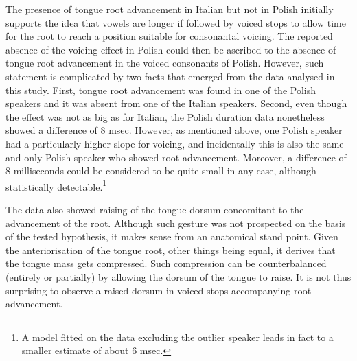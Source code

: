\documentclass[authoryear]{elsarticle}
\begin{document}
The presence of tongue root advancement in Italian but not in Polish
initially supports the idea that vowels are longer if followed by voiced
stops to allow time for the root to reach a position suitable for
consonantal voicing. The reported absence of the voicing effect in
Polish could then be ascribed to the absence of tongue root advancement
in the voiced consonants of Polish. However, such statement is
complicated by two facts that emerged from the data analysed in this
study. First, tongue root advancement was found in one of the Polish
speakers and it was absent from one of the Italian speakers. Second,
even though the effect was not as big as for Italian, the Polish
duration data nonetheless showed a difference of 8 msec. However, as
mentioned above, one Polish speaker had a particularly higher slope for
voicing, and incidentally this is also the same and only Polish speaker
who showed root advancement. Moreover, a difference of 8 milliseconds
could be considered to be quite small in any case, although
statistically
detectable.\footnote{A model fitted on the data excluding the outlier speaker leads in fact to a smaller estimate of about 6 msec.}

The data also showed raising of the tongue dorsum concomitant to the
advancement of the root. Although such gesture was not prospected on the
basis of the tested hypothesis, it makes sense from an anatomical stand
point. Given the anteriorisation of the tongue root, other things being
equal, it derives that the tongue mass gets compressed. Such compression
can be counterbalanced (entirely or partially) by allowing the dorsum of
the tongue to raise. It is not thus surprising to observe a raised
dorsum in voiced stops accompanying root advancement.


\end{document}
